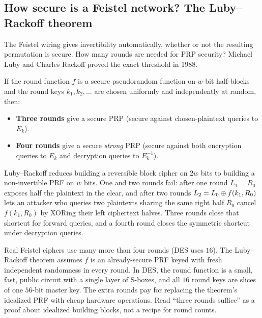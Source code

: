 \subsection{How secure is a Feistel network? The Luby--Rackoff theorem}

The Feistel wiring gives invertibility automatically, whether or not the resulting permutation is secure. How many rounds are needed for PRP security? Michael Luby and Charles Rackoff proved the exact threshold in 1988.

\begin{theorem}
\label{ch11:luby-rackoff}
If the round function $f$ is a secure pseudorandom function on $w$-bit half-blocks and the round keys $k_1, k_2, \dots$ are chosen uniformly and independently at random, then:
\begin{itemize}
  \item \textbf{Three rounds} give a secure PRP (secure against chosen-plaintext queries to $E_k$).
  \item \textbf{Four rounds} give a secure \emph{strong} PRP (secure against both encryption queries to $E_k$ and decryption queries to $E_k^{-1}$).
\end{itemize}
\end{theorem}

Luby--Rackoff reduces building a reversible block cipher on $2w$ bits to building a non-invertible PRF on $w$ bits. One and two rounds fail: after one round $L_1 = R_0$ exposes half the plaintext in the clear, and after two rounds $L_2 = L_0 \oplus f(k_1, R_0)$ lets an attacker who queries two plaintexts sharing the same right half $R_0$ cancel $f(k_1, R_0)$ by XORing their left ciphertext halves. Three rounds close that shortcut for forward queries, and a fourth round closes the symmetric shortcut under decryption queries.

\begin{trapbox}
Real Feistel ciphers use many more than four rounds (DES uses $16$). The Luby--Rackoff theorem assumes $f$ is an already-secure PRF keyed with fresh independent randomness in every round. In DES, the round function is a small, fast, public circuit with a single layer of S-boxes, and all $16$ round keys are slices of one $56$-bit master key. The extra rounds pay for replacing the theorem's idealized PRF with cheap hardware operations. Read ``three rounds suffice'' as a proof about idealized building blocks, not a recipe for round counts.
\end{trapbox}

